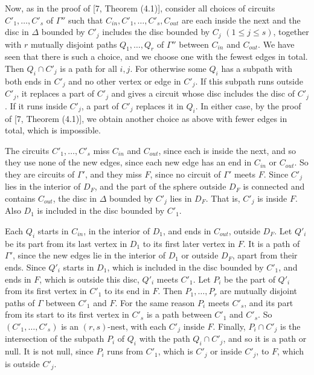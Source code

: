 {Now, as in the proof of [7, Theorem (4.1)], consider all choices of circuits $C'_1, \dots, C'_s$ of $\Gamma''$ such that $C_{in}, C'_1, \dots, C'_s, C_{out}$ are each inside the next and the disc in $\Delta$ bounded by $C'_j$ includes the disc bounded by $C_j$ $(1 \le j \le s)$, together with $r$ mutually disjoint paths $Q_1, \dots, Q_r$ of $\Gamma''$ between $C_{in}$ and $C_{out}$. We have seen that there is such a choice, and we choose one with the fewest edges in total. Then $Q_i \cap C'_j$ is a path for all $i, j$. For otherwise some $Q_i$ has a subpath with both ends in $C'_j$ and no other vertex or edge in $C'_j$. If this subpath runs outside $C'_j$, it replaces a part of $C'_j$ and gives a circuit whose disc includes the disc of $C'_j$. If it runs inside $C'_j$, a part of $C'_j$ replaces it in $Q_i$. In either case, by the proof of [7, Theorem (4.1)], we obtain another choice as above with fewer edges in total, which is impossible.

The circuits $C'_1, \dots, C'_s$ miss $C_{in}$ and $C_{out}$, since each is inside the next, and so they use none of the new edges, since each new edge has an end in $C_{in}$ or $C_{out}$. So they are circuits of $\Gamma'$, and they miss $F$, since no circuit of $\Gamma'$ meets $F$. Since $C'_j$ lies in the interior of $D_F$, and the part of the sphere outside $D_F$ is connected and contains $C_{out}$, the disc in $\Delta$ bounded by $C'_j$ lies in $D_F$. That is, $C'_j$ is inside $F$. Also $D_1$ is included in the disc bounded by $C'_1$.

Each $Q_i$ starts in $C_{in}$, in the interior of $D_1$, and ends in $C_{out}$, outside $D_F$. Let $Q'_i$ be its part from its last vertex in $D_1$ to its first later vertex in $F$. It is a path of $\Gamma'$, since the new edges lie in the interior of $D_1$ or outside $D_F$, apart from their ends. Since $Q'_i$ starts in $D_1$, which is included in the disc bounded by $C'_1$, and ends in $F$, which is outside this disc, $Q'_i$ meets $C'_1$. Let $P_i$ be the part of $Q'_i$ from its first vertex in $C'_1$ to its end in $F$. Then $P_1, \dots, P_r$ are mutually disjoint paths of $\Gamma$ between $C'_1$ and $F$. For the same reason $P_i$ meets $C'_s$, and its part from its start to its first vertex in $C'_s$ is a path between $C'_1$ and $C'_s$. So $(C'_1, \dots, C'_s)$ is an $(r, s)$-nest, with each $C'_j$ inside $F$. Finally, $P_i \cap C'_j$ is the intersection of the subpath $P_i$ of $Q_i$ with the path $Q_i \cap C'_j$, and so it is a path or null. It is not null, since $P_i$ runs from $C'_1$, which is $C'_j$ or inside $C'_j$, to $F$, which is outside $C'_j$.
}

